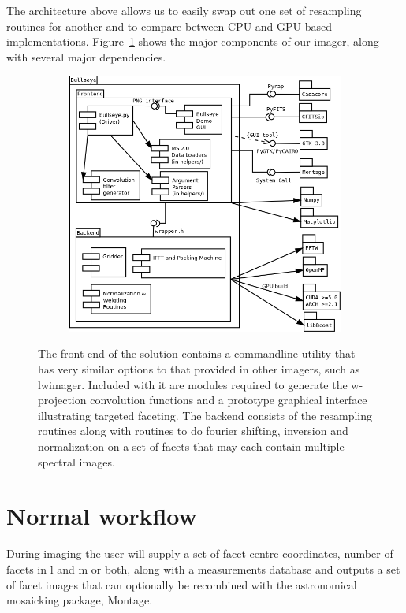 The architecture above allows us to easily swap out one set of resampling routines for another and to compare between CPU and GPU-based implementations. Figure~\ref{fig_arch} shows
the major components of our imager, along with several major dependencies. 
\begin{figure}[h]
  \begin{mdframed}
    \centering
    \begin{subfigure}[b]{0.66\textwidth}
      \centering
      \includegraphics[width=\textwidth]{images/bullseye_arch.png}
      \caption{}
    \end{subfigure}  
    \caption[Bullseye Architecture]{The front end of the solution contains a commandline utility that has very similar options to that provided in other imagers, such as lwimager.
    Included with it are modules required to generate the w-projection convolution functions and a prototype graphical interface illustrating targeted faceting. The backend consists
    of the resampling routines along with routines to do fourier shifting, inversion and normalization on a set of facets that may each contain multiple spectral images.}
    \label{fig_arch}
  \end{mdframed}
\end{figure}
\section{Normal workflow}
During imaging the user will supply a set of facet centre coordinates, number of facets in l and m or both, along with a measurements database and outputs a set of facet images that can optionally
be recombined with the astronomical mosaicking package, Montage.
